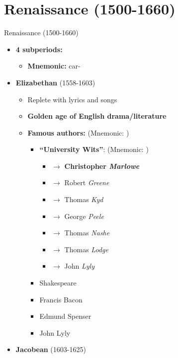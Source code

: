 \documentclass[
  12pt,
    progressbar=frametitle]{beamer}
\providecommand{\tightlist}{%
  \setlength{\itemsep}{0pt}\setlength{\parskip}{0pt}}
\begin{document}
\section{Renaissance (1500-1660)}
\begin{frame}[allowframebreaks]
{Renaissance (1500-1660)}
\begin{itemize}
\tightlist
\item
  \textbf{4 subperiods:}

  \begin{itemize}
  \tightlist
  \item
    \textbf{Mnemonic:} \footnotesize{}\;\normalsize
    car-\footnotesize{}\;\normalsize
  \end{itemize}
\item
  \textbf{Elizabethan} (1558-1603)

  \begin{itemize}
  \tightlist
  \item
    Replete with lyrics and songs
  \item
    \textbf{Golden age of English drama/literature}
  \item
    \textbf{Famous authors:} (Mnemonic: \footnotesize
    \footnotesize{}\;\normalsize\normalsize)

    \begin{itemize}
    \tightlist
    \item
      \textbf{``University Wits''}: (Mnemonic:
      \footnotesize{}\;\normalsize)

      \begin{itemize}
      \tightlist
      \item
        \footnotesize{}\;\normalsize \(\rightarrow\)
        \textbf{Christopher \emph{Marlowe}}
      \item
        \footnotesize{}\;\normalsize \(\rightarrow\)
        Robert \emph{Greene}
      \item
        \footnotesize{}\;\normalsize \(\rightarrow\)
        Thomas \emph{Kyd}
      \item
        \footnotesize{}\;\normalsize \(\rightarrow\)
        George \emph{Peele}
      \item
        \footnotesize{}\;\normalsize \(\rightarrow\)
        Thomas \emph{Nashe}
      \item
        \footnotesize{}\;\normalsize \(\rightarrow\) Thomas
        \emph{Lodge}
      \item
        \footnotesize{}\;\normalsize \(\rightarrow\) John
        \emph{Lyly}
      \end{itemize}
    \item
      Shakespeare
    \item
      Francis Bacon
    \item
      Edmund Spenser
    \item
      John Lyly
    \end{itemize}
  \end{itemize}
\item
  \textbf{Jacobean} (1603-1625)


\end{itemize}
\end{frame}
\end{document}
